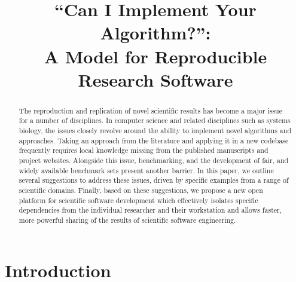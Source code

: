 \documentclass[conference]{IEEEtran}
\begin{document}

\title{``Can I Implement Your Algorithm?'':\\ A Model for Reproducible Research Software}

\author{
\and
{}
\and
{}
 }

\maketitle

\begin{abstract}
The reproduction and replication of novel scientific results has
become a major issue for a number of disciplines. In computer science
and related disciplines such as systems biology, the issues closely
revolve around the ability to implement novel algorithms and
approaches. Taking an approach from the literature and applying it in
a new codebase frequently requires local knowledge missing from the
published manuscripts and project websites. Alongside this issue,
benchmarking, and the development of fair, and widely available
benchmark sets present another barrier. In this paper, we outline
several suggestions to address these issues, driven by specific
examples from a range of scientific domains.  Finally, based on these
suggestions, we propose a new open platform for scientific software
development which effectively isolates specific dependencies from the
individual researcher and their workstation and allows faster, more
powerful sharing of the results of scientific software engineering.
\end{abstract}

\IEEEpeerreviewmaketitle

\section{Introduction}
\end{document}
